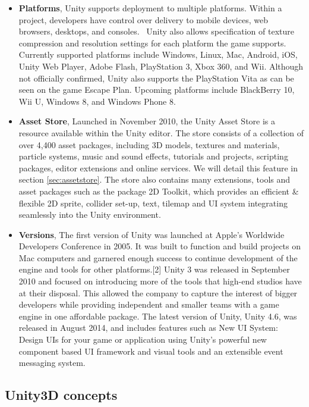 \begin{itemize}
\item \textbf{Platforms}, Unity supports deployment to multiple platforms. Within a project, developers
have control over delivery to mobile devices, web browsers, desktops, and consoles.~\cite{unitypress2}
Unity also allows specification of texture compression and resolution settings for each platform the game supports.~\cite{unitypress2}
Currently supported platforms include Windows, Linux, Mac, Android, iOS, Unity Web Player, Adobe Flash, PlayStation 3, Xbox 360, and Wii. Although not officially confirmed, Unity also supports the PlayStation Vita as can be seen on the game Escape Plan. Upcoming platforms include BlackBerry 10, Wii U, Windows 8, and Windows Phone 8.
\item \textbf{Asset Store}, Launched in November 2010, the Unity Asset Store is a resource available
within the Unity editor. The store consists of a collection of over 4,400 asset packages, including 3D models, textures and materials, particle systems, music and sound effects, tutorials and projects, scripting packages, editor extensions and online services. We will detail this feature in section \ref{sec:assetstore}. The store also contains many extensions, tools and asset packages such as the package 2D Toolkit, which provides an efficient \& flexible 2D sprite, collider set-up, text, tilemap and UI system integrating seamlessly into the Unity environment.
\item \textbf{Versions}, The first version of Unity was launched at Apple’s Worldwide Developers Conference in 2005. It was built to function and build projects on Mac computers and garnered enough success to continue development of the engine and tools for other platforms.[2] Unity 3 was released in September 2010 and focused on introducing more of the tools that high-end studios have at their disposal. This allowed the company to capture the interest of bigger developers while providing independent and smaller teams with a game engine in one affordable package. The latest version of Unity, Unity 4.6, was released in August 2014, and includes features such as New UI System: Design UIs for your game or application using Unity's powerful new component based UI framework and visual tools and an extensible event messaging system.
\end{itemize}

\subsection{Unity3D concepts}
\label{subsec:unityconcepts}

